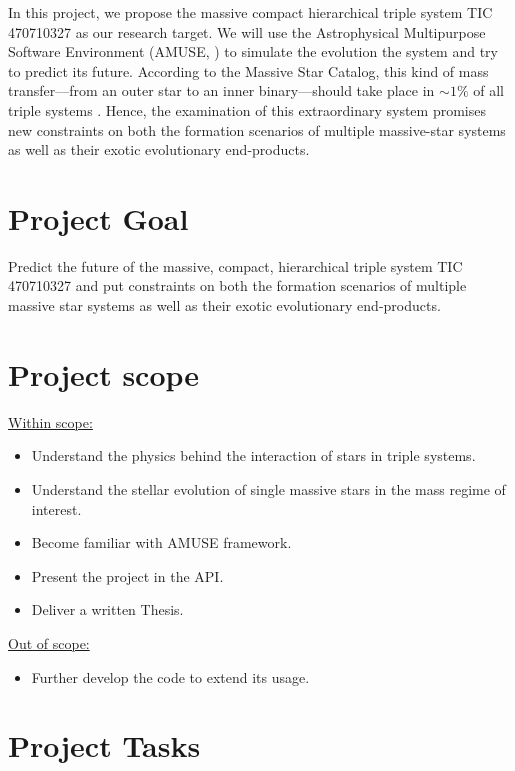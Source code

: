 \documentclass{uva-inf-article}
\numberwithin{equation}{section}
\begin{document}
In this project, we propose the massive compact hierarchical triple system TIC 470710327 as our research target. We will use the Astrophysical Multipurpose Software Environment (AMUSE, \cite{portegies2018astrophysical}) to simulate the evolution the system and try to predict its future. According to the Massive Star Catalog, this kind of mass transfer—from an outer star to an inner binary—should take place in $ \sim 1\%$ of all triple systems \citep{de2014evolution,hamers2022statistical}. Hence, the examination of this extraordinary system promises new constraints on both the formation scenarios of multiple massive-star systems as well as their exotic evolutionary end-products.
\\

\section{Project Goal}

Predict the future of the massive, compact, hierarchical triple system TIC 470710327 and put constraints on both the formation scenarios of multiple massive star systems as well as their exotic evolutionary end-products.

\section{Project scope}
\underline{Within scope:}
\begin{itemize}
    \item Understand the physics behind the interaction of stars in triple systems.
    \item Understand the stellar evolution of single massive stars in the mass regime of interest.
    \item Become familiar with AMUSE framework.
    \item Present the project in the API.
    \item Deliver a written Thesis.
\end{itemize}

\hspace*{-0.7cm}\underline{Out of scope:}
\begin{itemize}
    \item Further develop the code to extend its usage.
\end{itemize}

\section{Project Tasks}
\end{document}
